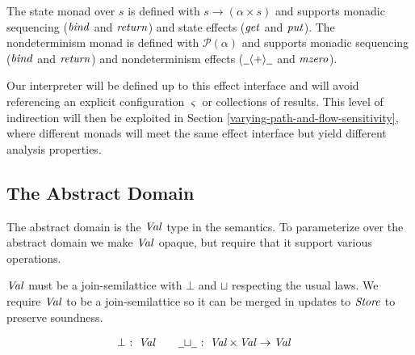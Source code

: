 The state monad over $s$ is defined with
$s  \rightarrow  ( \alpha   \times  s)$ and supports monadic sequencing
($ \operatorname{\mathit{bind}} $ and $ \operatorname{\mathit{return}} $) and state effects
($ \operatorname{\mathit{get}} $ and $ \operatorname{\mathit{put}} $). The nondeterminism monad is defined
with $ \mathcal{P} ( \alpha )$ and supports monadic sequencing
($ \operatorname{\mathit{bind}} $ and $ \operatorname{\mathit{return}} $) and nondeterminism effects
($ \underline{\hspace{0.5em}}{  \mathbin{\langle + \rangle}  }\underline{\hspace{0.5em}} $
and $ \operatorname{\mathit{mzero}} $).

\par

Our interpreter will be defined up to this effect interface and will
avoid referencing an explicit configuration $ \varsigma $ or collections
of results. This level of indirection will then be exploited in Section
\ref{varying-path-and-flow-sensitivity}, where different monads will
meet the same effect interface but yield different analysis properties.

\par

\subsection{The Abstract Domain}\label{the-abstract-domain}

\par

The abstract domain is the $ \operatorname{\mathit{Val}} $ type in the semantics. To
parameterize over the abstract domain we make $ \operatorname{\mathit{Val}} $ opaque, but
require that it support various operations.

\par

$ \operatorname{\mathit{Val}} $ must be a join-semilattice with $ \bot $ and $ \sqcup $
respecting the usual laws. We require $ \operatorname{\mathit{Val}} $ to be a
join-semilattice so it can be merged in updates to $ \operatorname{\mathit{Store}} $ to
preserve soundness.

\small\begin{alignat*}{2}
 \bot   \mathbin{\colon}   \operatorname{\mathit{Val}}  &  \hspace{1em}  \hspace{1em}  \underline{\hspace{0.5em}}{  \sqcup  }\underline{\hspace{0.5em}}   \mathbin{\colon}   \operatorname{\mathit{Val}}   \times   \operatorname{\mathit{Val}}   \rightarrow   \operatorname{\mathit{Val}} 
\end{alignat*}\normalsize

